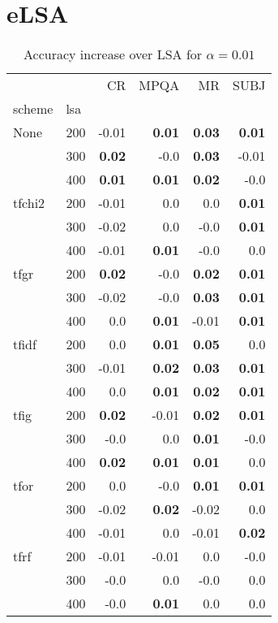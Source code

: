 \section{eLSA}

\begin{table}[H]
\begin{center}

\begin{tabular}{ll|rrrr}
\toprule
   &   &   CR &  MPQA &   MR &  SUBJ \\
scheme & lsa &        &        &        &        \\
\midrule
None & 200 &     -0.01 & \textbf{0.01} & \textbf{0.03} & \textbf{0.01} \\
   & 300 & \textbf{0.02} &     -0.0 & \textbf{0.03} &     -0.01 \\
   & 400 & \textbf{0.01} & \textbf{0.01} & \textbf{0.02} &     -0.0 \\
tfchi2 & 200 &     -0.01 &      0.0 &      0.0 & \textbf{0.01} \\
   & 300 &     -0.02 &      0.0 &     -0.0 & \textbf{0.01} \\
   & 400 &     -0.01 & \textbf{0.01} &     -0.0 &      0.0 \\
tfgr & 200 & \textbf{0.02} &     -0.0 & \textbf{0.02} & \textbf{0.01} \\
   & 300 &     -0.02 &     -0.0 & \textbf{0.03} & \textbf{0.01} \\
   & 400 &      0.0 & \textbf{0.01} &     -0.01 & \textbf{0.01} \\
tfidf & 200 &      0.0 & \textbf{0.01} & \textbf{0.05} &      0.0 \\
   & 300 &     -0.01 & \textbf{0.02} & \textbf{0.03} & \textbf{0.01} \\
   & 400 &      0.0 & \textbf{0.01} & \textbf{0.02} & \textbf{0.01} \\
tfig & 200 & \textbf{0.02} &     -0.01 & \textbf{0.02} & \textbf{0.01} \\
   & 300 &     -0.0 &      0.0 & \textbf{0.01} &     -0.0 \\
   & 400 & \textbf{0.02} & \textbf{0.01} & \textbf{0.01} &      0.0 \\
tfor & 200 &      0.0 &     -0.0 & \textbf{0.01} & \textbf{0.01} \\
   & 300 &     -0.02 & \textbf{0.02} &     -0.02 &      0.0 \\
   & 400 &     -0.01 &      0.0 &     -0.01 & \textbf{0.02} \\
tfrf & 200 &     -0.01 &     -0.01 &      0.0 &     -0.0 \\
   & 300 &     -0.0 &      0.0 &     -0.0 &      0.0 \\
   & 400 &     -0.0 & \textbf{0.01} &      0.0 &      0.0 \\
\bottomrule
\end{tabular}

\caption[Accuracy increase over LSA for $\alpha=0.01$]{Accuracy increase over LSA for $\alpha=0.01$}
\label{tab:batch:results0.01}
\end{center}
\end{table}






